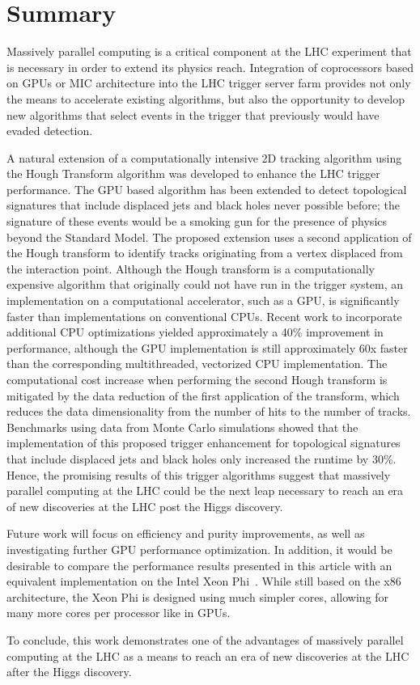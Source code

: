 \documentclass[preprint,sort&compress]{elsarticle}
\begin{document}
\section{Summary}

Massively parallel computing is a critical component at the LHC experiment that is necessary in order to
extend its physics reach. Integration of coprocessors based on GPUs or MIC architecture into the LHC trigger
server farm provides not only the means to accelerate existing algorithms, but also the opportunity to develop
new algorithms that select events in the trigger that previously would have evaded detection.

A natural extension of a computationally intensive 2D tracking algorithm using the Hough Transform algorithm was developed to enhance the LHC trigger performance.
The GPU based algorithm has been extended to detect topological signatures that include displaced jets and black holes never possible before; 
the signature of these events would be a smoking gun for the presence of physics beyond the Standard Model. 
The proposed extension uses a second application of the Hough transform to identify tracks originating from a vertex displaced from the interaction point. 
 Although the Hough transform is a computationally expensive algorithm that originally could not have run in the trigger system, an implementation on a computational accelerator, such as a GPU, 
is significantly faster than implementations on conventional CPUs.  Recent work to incorporate additional CPU optimizations yielded approximately a 40\% improvement in performance, 
although the GPU implementation is still approximately 60x faster than the corresponding multithreaded, vectorized CPU implementation.  The computational cost increase when performing the second
 Hough transform is mitigated by the data reduction of the first application of the transform, which reduces the data dimensionality from the number of hits to the number of tracks. 
 Benchmarks using data from Monte Carlo simulations showed that the implementation of this proposed trigger enhancement for topological signatures that include 
displaced jets and black holes only increased the runtime by 30\%. Hence, the promising results of this trigger algorithms suggest that massively parallel computing at the LHC could be the next leap necessary 
to reach an era of new discoveries at the LHC post the Higgs discovery. 

Future work will focus on efficiency and purity improvements, as well as investigating further GPU performance optimization.  In addition, it would be desirable to compare the performance results presented in this article with an equivalent implementation on the Intel Xeon Phi~\cite{bib:Halyo:2013gja}.  While still based on the x86 architecture, the Xeon Phi is designed using much simpler cores, allowing for many more cores per processor like in GPUs.

To conclude, this work demonstrates one of the advantages of massively parallel computing at the LHC as a means
to reach an era of new discoveries at the LHC after the Higgs discovery.




\end{document}

